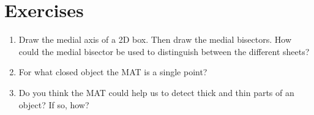 %
\section{Exercises}

\begin{enumerate}
  \item Draw the medial axis of a 2D box. Then draw the medial bisectors. How could the medial bisector be used to distinguish between the different sheets?
  \item For what closed object the MAT is a single point?
  \item Do you think the MAT could help us to detect thick and thin parts of an object? If so, how?
\end{enumerate}
